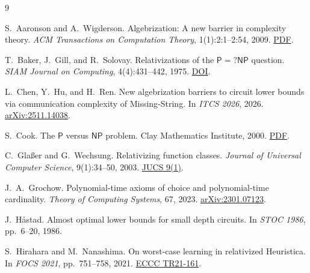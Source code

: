 \documentclass[11pt,a4paper]{article}
\newcommand{\Pcl}{\mathsf{P}}
\newcommand{\NP}{\mathsf{NP}}
\begin{document}
\begin{thebibliography}{9}

S.~Aaronson and A.~Wigderson.
Algebrization: A new barrier in complexity theory.
\emph{ACM Transactions on Computation Theory}, 1(1):2:1--2:54, 2009.
\href{https://www.scottaaronson.com/papers/alg.pdf}{PDF}.

T.~Baker, J.~Gill, and R.~Solovay.
Relativizations of the $\Pcl = ?\NP$ question.
\emph{SIAM Journal on Computing}, 4(4):431--442, 1975.
\href{https://epubs.siam.org/doi/10.1137/0204037}{DOI}.

L.~Chen, Y.~Hu, and H.~Ren.
New algebrization barriers to circuit lower bounds via communication complexity of Missing-String.
In \emph{ITCS 2026}, 2026.
\href{https://arxiv.org/abs/2511.14038}{arXiv:2511.14038}.

S.~Cook.
The $\Pcl$ versus $\NP$ problem.
Clay Mathematics Institute, 2000.
\href{https://www.claymath.org/wp-content/uploads/2022/06/pvsnp.pdf}{PDF}.

C.~Gla\ss er and G.~Wechsung.
Relativizing function classes.
\emph{Journal of Universal Computer Science}, 9(1):34--50, 2003.
\href{https://lib.jucs.org/issue/4069/}{JUCS 9(1)}.

J.~A.~Grochow.
Polynomial-time axioms of choice and polynomial-time cardinality.
\emph{Theory of Computing Systems}, 67, 2023.
\href{https://arxiv.org/abs/2301.07123}{arXiv:2301.07123}.

J.~H\aa stad.
Almost optimal lower bounds for small depth circuits.
In \emph{STOC 1986}, pp.~6--20, 1986.

S.~Hirahara and M.~Nanashima.
On worst-case learning in relativized Heuristica.
In \emph{FOCS 2021}, pp.~751--758, 2021.
\href{https://eccc.weizmann.ac.il/report/2021/161/download}{ECCC TR21-161}.

\end{thebibliography}
\end{document}
